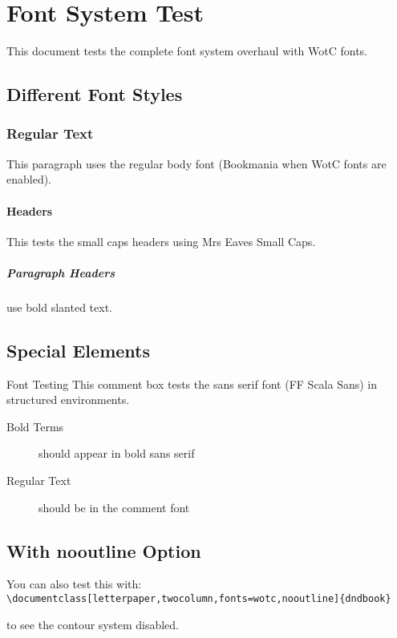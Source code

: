 \documentclass[fonts=wotc, bg=none, nooutline, letterpaper,twocolumn]{dndbook}
\begin{document}
\chapter{Font System Test}

This document tests the complete font system overhaul with WotC fonts.

\section{Different Font Styles}

\subsection{Regular Text}
This paragraph uses the regular body font (Bookmania when WotC fonts are enabled).

\subsubsection{Headers}
This tests the small caps headers using Mrs Eaves Small Caps.

\paragraph{Paragraph Headers} use bold slanted text.

\section{Special Elements}


\begin{DndComment}{Font Testing}
This comment box tests the sans serif font (FF Scala Sans) in structured environments.

\begin{description}
  \item[Bold Terms] should appear in bold sans serif
  \item[Regular Text] should be in the comment font
\end{description}
\end{DndComment}

\section{With nooutline Option}

You can also test this with: 
\verb|\documentclass[letterpaper,twocolumn,fonts=wotc,nooutline]{dndbook}|

to see the contour system disabled.
\end{document}
